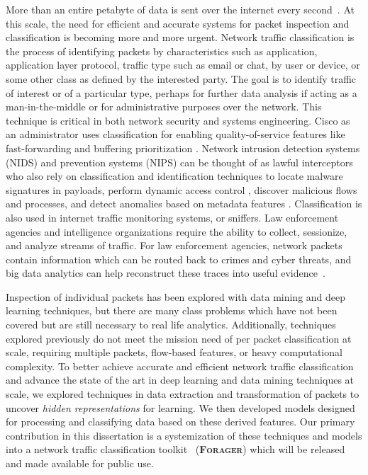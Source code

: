 More than an entire petabyte of data is sent over the internet every second~\cite{verma2022}. At this scale, the need for efficient and accurate systems for packet inspection and classification is becoming more and more urgent. Network traffic classification is the process of identifying packets by characteristics such as application, application layer protocol, traffic type such as email or chat, by user or device, or some other class as defined by the interested party. The goal is to identify traffic of interest or of a particular type, perhaps for further data analysis if acting as a man-in-the-middle or for administrative purposes over the network. This technique is critical in both network security and systems engineering. Cisco as an administrator uses classification for enabling quality-of-service features like fast-forwarding and buffering prioritization \cite{Cisco}. Network intrusion detection systems (NIDS) and prevention systems (NIPS) can be thought of as lawful interceptors who also rely on classification and identification techniques to locate malware signatures in payloads, perform dynamic access control \cite{DIAS2019143}, discover malicious flows and processes, and detect anomalies based on metadata features \cite{Boger}. Classification is also used in internet traffic monitoring systems, or sniffers. Law enforcement agencies and intelligence organizations require the ability to collect, sessionize, and analyze streams of traffic. For law enforcement agencies, network packets contain information which can be routed back to crimes and cyber threats, and big data analytics can help reconstruct these traces into useful evidence~\cite{actionable-intelligence}.

Inspection of individual packets has been explored with data mining and deep learning techniques, but there are many class problems which have not been covered but are still necessary to real life analytics. Additionally, techniques explored previously do not meet the mission need of per packet classification at scale, requiring multiple packets, flow-based features, or heavy computational complexity. To better achieve accurate and efficient network traffic classification and advance the state of the art in deep learning and data mining techniques at scale, we explored techniques in data extraction and transformation of packets to uncover \textit{hidden representations} for learning. We then developed models designed for processing and classifying data based on these derived features. Our primary contribution in this dissertation is a systemization of these techniques and models into a network traffic classification toolkit ~\textsc{(\textbf{Forager})} which will be released and made available for public use.

